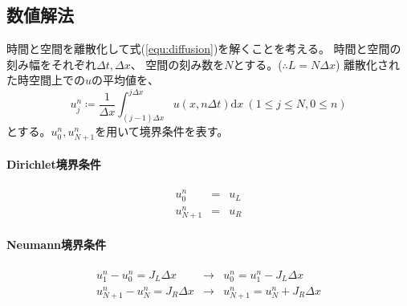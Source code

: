 \documentclass[a4j, titlepage]{jsarticle}
\numberwithin{equation}{section}
\begin{document}
    \subsection{数値解法}
        時間と空間を離散化して式(\ref{equ:diffusion})を解くことを考える。
        時間と空間の刻み幅をそれぞれ$\Delta t, \Delta x$、
        空間の刻み数を$N$とする。($\therefore L = N\Delta x$)
        離散化された時空間上での$u$の平均値を、
        \begin{equation*}
            u_j^n \coloneqq \frac{1}{\Delta x}\int_{(j - 1)\Delta x}^{j\Delta x}u(x, n\Delta t)\mathrm{d}x \ (1 \leq j \leq N, 0 \leq n)
        \end{equation*}
        とする。$u_0^n, u_{N + 1}^n$を用いて境界条件を表す。

        \paragraph{Dirichlet境界条件}
            \begin{eqnarray*}
                u_0^n &=& u_L \\
                u_{N + 1}^n &=& u_R
            \end{eqnarray*}

        \paragraph{Neumann境界条件}
            \begin{eqnarray*}
                u_1^n - u_0^n = J_L\Delta x &\rightarrow& u_0^n = u_1^n - J_L\Delta x \\
                u_{N + 1}^n - u_N^n = J_R\Delta x &\rightarrow& u_{N + 1}^n = u_N^n + J_R\Delta x
            \end{eqnarray*}
\end{document}

